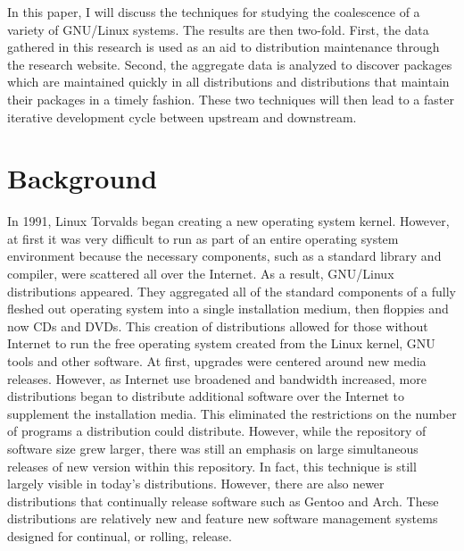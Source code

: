 \documentclass[letterpaper,10pt]{article}
\begin{document}
In this paper, I will discuss the techniques for studying the coalescence of a variety of GNU/Linux systems.  The results are then two-fold.  First, the data gathered in this research is used as an aid to distribution maintenance through the research website.  Second, the aggregate data is analyzed to discover packages which are maintained quickly in all distributions and distributions that maintain their packages in a timely fashion.  These two techniques will then lead to a faster iterative development cycle between upstream and downstream.
\section{Background}
In 1991, Linux Torvalds began creating a new operating system kernel.  However, at first it was very difficult to run as part of an entire operating system environment because the necessary components, such as a standard library and compiler, were scattered all over the Internet.  As a result, GNU/Linux distributions appeared.  They aggregated all of the standard components of a fully fleshed out operating system into a single installation medium, then floppies and now CDs and DVDs.  This creation of distributions allowed for those without Internet to run the free operating system created from the Linux kernel, GNU tools and other software.  At first, upgrades were centered around new media releases.  However, as Internet use broadened and bandwidth increased, more distributions began to distribute additional software over the Internet to supplement the installation media.  This eliminated the restrictions on the number of programs a distribution could distribute.  However, while the repository of software size grew larger, there was still an emphasis on large simultaneous releases of new version within this repository.  In fact, this technique is still largely visible in today's distributions.  However, there are also newer distributions that continually release software such as Gentoo and Arch.  These distributions are relatively new and feature new software management systems designed for continual, or rolling, release.
\end{document}
